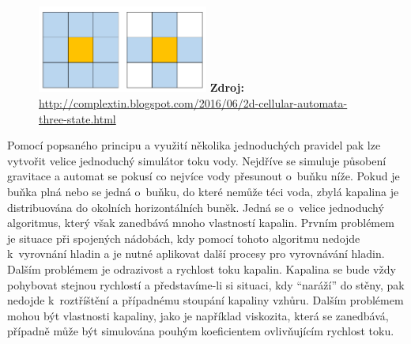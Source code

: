 \begin{figure}[hbt]
	\centering
	\captionsetup{justification=centering}
	\includegraphics[width=0.5\textwidth]{obrazky-figures/Neighborhood.png}
	\textbf{Zdroj: } \url{http://complextin.blogspot.com/2016/06/2d-cellular-automata-three-state.html}
	\label{fig:neighbours}
\end{figure}

Pomocí popsaného principu a využití několika jednoduchých pravidel pak lze vytvořit velice jednoduchý simulátor toku vody. Nejdříve se simuluje působení gravitace a automat se pokusí co nejvíce vody přesunout o~buňku níže. Pokud je buňka plná nebo se jedná o~buňku, do které nemůže téci voda, zbylá kapalina je distribuována do okolních horizontálních buněk. Jedná se o~velice jednoduchý algoritmus, který však zanedbává mnoho vlastností kapalin. Prvním problémem je situace při spojených nádobách, kdy pomocí tohoto algoritmu nedojde k~vyrovnání hladin a je nutné aplikovat další procesy pro vyrovnávání hladin. Dalším problémem je odrazivost a rychlost toku kapalin. Kapalina se bude vždy pohybovat stejnou rychlostí a představíme-li si situaci, kdy \enquote{naráží} do stěny, pak nedojde k~roztříštění a případnému stoupání kapaliny vzhůru. Dalším problémem mohou být vlastnosti kapaliny, jako je například viskozita, která se zanedbává, případně může být simulována pouhým koeficientem ovlivňujícím rychlost toku. \cite{Medvecky-Heretik2018thesis}

